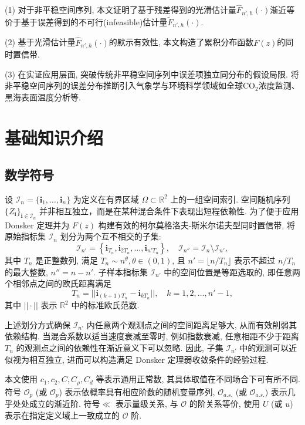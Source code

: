 \documentclass[a4paper,openay,14pt]{ctexbook}
\numberwithin{equation}{section}
\numberwithin{lem}{section}
\newcommand{\chapterwithfancyheader}[1]{  
    \chapter{#1} %
    \thispagestyle{fancy} %
}
\begin{document}
(1) 对于非平稳空间序列, 本文证明了基于残差得到的光滑估计量$\hat{F}_{n',h}(\cdot)$渐近等价于基于误差得到的不可行(infeasible)估计量$\tilde{F}_{n',h}(\cdot)$.

(2) 基于光滑估计量$\hat{F}_{n',h}(\cdot)$的默示有效性, 本文构造了累积分布函数$F(z)$的同时置信带.

(3) 在实证应用层面, 突破传统非平稳空间序列中误差项独立同分布的假设局限. 将非平稳空间序列的误差分布推断引入气象学与环境科学领域如全球CO$_2$浓度监测、黑海表面温度分析等.

\chapterwithfancyheader{基础知识介绍}\label{SEC: Preliminary}

\section{数学符号}
设 \(\mathcal{I}_n = \{\mathbf{i}_1, \ldots, \mathbf{i}_n\}\) 为定义在有界区域 \(\Omega \subset \mathbb{R}^2\) 上的一组空间索引. 空间随机序列 $\{Z_{\mathbf{i}}\}_{\mathbf{i} \in \mathcal{I}_n}$ 并非相互独立，而是在某种混合条件下表现出短程依赖性. 为了便于应用 Donsker 定理并为 $F(z)$ 构建有效的柯尔莫格洛夫-斯米尔诺夫型同时置信带, 将原始指标集 $\mathcal{I}_n$ 划分为两个互不相交的子集:
\[
\mathcal{I}_{n'} = \left\{ \mathbf{i}_{T_n}, \mathbf{i}_{2T_n}, \ldots, \mathbf{i}_{n' T_n} \right\}, 
\quad 
\mathcal{I}_{n''} = \mathcal{I}_n \setminus \mathcal{I}_{n'},
\]
其中 $T_n$ 是正整数列, 满足 $T_n \sim n^{\theta}, \theta \in (0,1)$, 且 $n' = \lfloor n / T_n \rfloor$ 表示不超过 $n/T_n$ 的最大整数, $n'' = n - n'$. 子样本指标集 $\mathcal{I}_{n'}$ 中的空间位置是等距选取的, 即任意两个相邻点之间的欧氏距离满足
\[
T_n = ||\mathbf{i}_{(k+1)T_n} - \mathbf{i}_{kT_n}||, \quad k = 1,2,\dots,n'-1,
\]
其中 $||\cdot||$ 表示 $\mathbb{R}^2$ 中的标准欧氏范数.

上述划分方式确保 $\mathcal{I}_{n'}$ 内任意两个观测点之间的空间距离足够大, 从而有效削弱其依赖结构. 当混合系数以适当速度衰减至零时, 例如指数衰减, 任意相距不少于距离 $T_n$ 的观测点之间的依赖性在渐近意义下可以忽略. 因此, 子集 $\mathcal{I}_{n'}$ 中的观测可以近似视为相互独立, 进而可以构造满足 Donsker 定理弱收敛条件的经验过程.

本文使用 $c_1, c_2, C, C_\rho, C_d$ 等表示通用正常数, 其具体取值在不同场合下可有所不同.
符号 $\mathcal{O}_p$ (或 $\scriptstyle{\mathcal{O}}_p$) 表示依概率具有相应阶数的随机变量序列,  $\mathcal{O}_{a.s.}$ (或 $\scriptstyle{\mathcal{O}}_{a.s.}$) 表示几乎处处成立的渐近阶.
符号$\ll$ 表示量级关系, 与 $\mathcal{O}$ 的阶关系等价, 使用 $U$ (或 $u$) 表示在指定定义域上一致成立的 $\mathcal{O}$ 阶.
\end{document}
